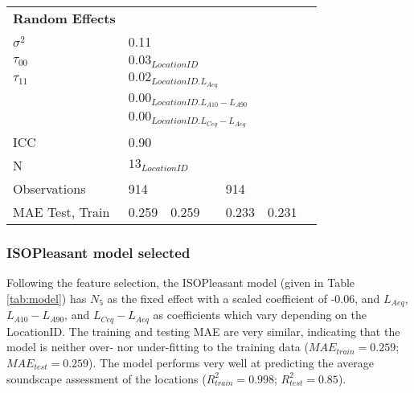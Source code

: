\begin{table}[ht]
\begin{tabular}{@{}l|lccccc@{}}
\textbf{Random Effects} &
  &
  \multicolumn{1}{l}{} &
  \multicolumn{1}{l}{} &
  \multicolumn{1}{l}{} &
  \multicolumn{1}{l}{} &
  \multicolumn{1}{l}{} \\
$\sigma^2$ &
  0.11 &
  \multicolumn{1}{l}{} &
  \multicolumn{1}{l}{} &
  \multicolumn{1}{l}{} &
  \multicolumn{1}{l}{} &
  \multicolumn{1}{l}{} \\
$\tau_{00}$       & \multicolumn{6}{l}{$0.03_{LocationID}$}                                                                                   \\
$\tau_{11}$       & \multicolumn{6}{l}{$0.02_{LocationID.L_{Aeq}}$}                                                                           \\
                  & \multicolumn{6}{l}{$0.00_{LocationID.L_{A10}-L_{A90}}$}                                                                   \\
                  & \multicolumn{6}{l}{$0.00_{LocationID.L_{Ceq}-L_{Aeq}}$}                                                                   \\
ICC &
  0.90 &
  \multicolumn{1}{l}{} &
  \multicolumn{1}{l}{} &
  \multicolumn{1}{l}{} &
  \multicolumn{1}{l}{} &
  \multicolumn{1}{l}{} \\ \midrule
N                 & \multicolumn{6}{l}{$13_{LocationID}$}                                                                                     \\
Observations &
  914 &
  \multicolumn{1}{l}{} &
  \multicolumn{1}{l}{} &
  \multicolumn{1}{l}{914} &
  \multicolumn{1}{l}{} &
  \multicolumn{1}{l}{} \\ 
  
MAE Test, Train &
0.259 &
0.259 &
 &
\multicolumn{1}{l}{0.233} &
0.231 \\
  
  \bottomrule
\end{tabular}
\end{table}

\subsubsection{ISOPleasant model selected}
Following the feature selection, the ISOPleasant model (given in Table \ref{tab:model}) has $N_5$ as the fixed effect with a scaled coefficient of -0.06, and $L_{Aeq}$, $L_{A10}-L_{A90}$, and $L_{Ceq}-L_{Aeq}$ as coefficients which vary depending on the LocationID.  The training and testing MAE are very similar, indicating that the model is neither over- nor under-fitting to the training data ($MAE_{train} = 0.259$; $MAE_{test} = 0.259$). The model performs very well at predicting the average soundscape assessment of the locations ($R^2_{train} = 0.998$; $R^2_{test} = 0.85$).


